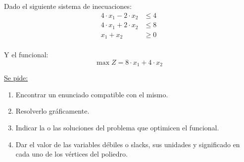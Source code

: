 \documentclass[../main.tex]{subfiles}
\begin{document}
        \begin{exercise}
            Dado el siguiente sistema de inecuaciones:
            \begin{equation}
                \begin{aligned}
                    4 \cdot x_1 - 2 \cdot x_2 &\leq 4 \\
                    4 \cdot x_1 + 2 \cdot x_2 &\leq 8 \\
                    x_1 + x_2 &\geq 0 \\
                \end{aligned}
            \end{equation}

            Y el funcional:
            \begin{equation}
                \max Z = 8 \cdot x_1 + 4 \cdot x_2 
            \end{equation}

            \underline{Se pide:}
            \begin{enumerate}[label=\alph*)]
                \item Encontrar un enunciado compatible con el mismo.
                \item Resolverlo gráficamente.
                \item Indicar la o las soluciones del problema que optimicen el funcional.
                \item Dar el valor de las variables débiles o slacks, sus unidades y significado en cada uno de los vértices del poliedro.
            \end{enumerate}


\end{exercise}
\end{document}
